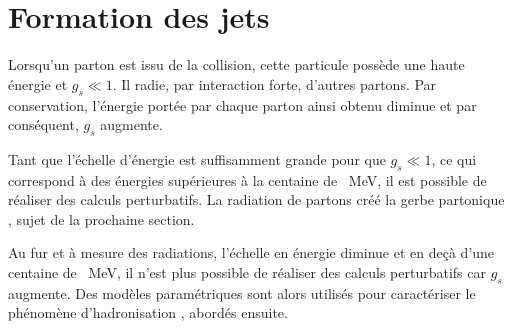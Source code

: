 \section{Formation des jets}\label{chapter-JERC-section-jets}
Lorsqu'un parton est issu de la collision, cette particule possède une haute énergie et $g_s \ll 1$.
Il radie, par interaction forte, d'autres partons.
Par conservation, l'énergie portée par chaque parton ainsi obtenu diminue et par conséquent, $g_s$ augmente.
\par Tant que l'échelle d'énergie est suffisamment grande pour que $g_s \ll 1$, ce qui correspond à des énergies supérieures à la centaine de \SI{}{\MeV}, il est possible de réaliser des calculs perturbatifs.
La radiation de partons créé la \og gerbe partonique \fg, sujet de la prochaine section.
\par Au fur et à mesure des radiations, l'échelle en énergie diminue et en deçà d'une centaine de \SI{}{\MeV}, il n'est plus possible de réaliser des calculs perturbatifs car $g_s$ augmente.
Des modèles paramétriques sont alors utilisés pour caractériser le phénomène d'\og hadronisation \fg, abordés ensuite.


